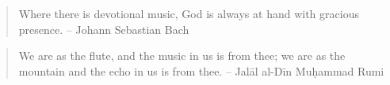 \documentclass[12pt]{article}
\begin{document}
\begin{quote}
  Where there is devotional music, God is always at hand with gracious presence. – Johann Sebastian Bach
\end{quote}

\begin{quote}
  We are as the flute, and the music in us is from thee; we are as the mountain and the echo in us is from thee. – Jalāl al-Dīn Muḥammad Rumi
\end{quote}





\end{document}
